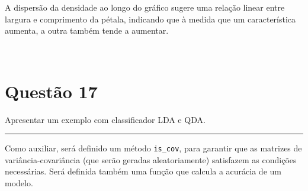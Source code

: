 \documentclass[
  a4paperpaper,
]{article}
\begin{document}
A dispersão da densidade ao longo do gráfico sugere uma relação linear
entre largura e comprimento da pétala, indicando que à medida que um
característica aumenta, a outra também tende a aumentar.

~

\section{Questão 17}\label{questuxe3o-17}

Apresentar um exemplo com classificador LDA e QDA.

\begin{center}\rule{0.5\linewidth}{0.5pt}\end{center}

Como auxiliar, será definido um método \texttt{is\_cov}, para garantir
que as matrizes de variância-covariância (que serão geradas
aleatoriamente) satisfazem as condições necessárias. Será definida
também uma função que calcula a acurácia de um modelo.
\end{document}
